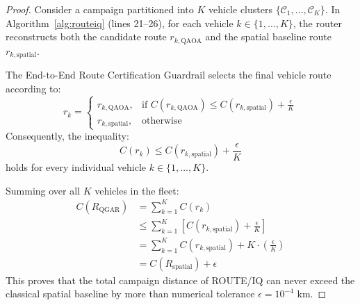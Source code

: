 \documentclass[journal,10pt]{IEEEtran}
\begin{document}
\begin{proof}
Consider a campaign partitioned into $K$ vehicle clusters $\{\mathcal{C}_1, \dots, \mathcal{C}_K\}$. In Algorithm~\ref{alg:routeiq} (lines 21--26), for each vehicle $k \in \{1, \dots, K\}$, the router reconstructs both the candidate route $r_{k, \text{QAOA}}$ and the spatial baseline route $r_{k, \text{spatial}}$. 

The End-to-End Route Certification Guardrail selects the final vehicle route according to:
\begin{equation}
r_k = \begin{cases} 
r_{k, \text{QAOA}}, & \text{if } C(r_{k, \text{QAOA}}) \le C(r_{k, \text{spatial}}) + \frac{\epsilon}{K} \\ 
r_{k, \text{spatial}}, & \text{otherwise} 
\end{cases}
\end{equation}
Consequently, the inequality:
\begin{equation}
C(r_k) \le C(r_{k, \text{spatial}}) + \frac{\epsilon}{K}
\end{equation}
holds for every individual vehicle $k \in \{1, \dots, K\}$.

Summing over all $K$ vehicles in the fleet:
\begin{align}
C(R_{\text{QGAR}}) &= \sum_{k=1}^K C(r_k) \nonumber \\
&\le \sum_{k=1}^K \left[ C(r_{k, \text{spatial}}) + \frac{\epsilon}{K} \right] \nonumber \\
&= \sum_{k=1}^K C(r_{k, \text{spatial}}) + K \cdot \left(\frac{\epsilon}{K}\right) \nonumber \\
&= C(R_{\text{spatial}}) + \epsilon
\end{align}
This proves that the total campaign distance of ROUTE/IQ can never exceed the classical spatial baseline by more than numerical tolerance $\epsilon = 10^{-4}\text{ km}$.
\end{proof}
\end{document}
